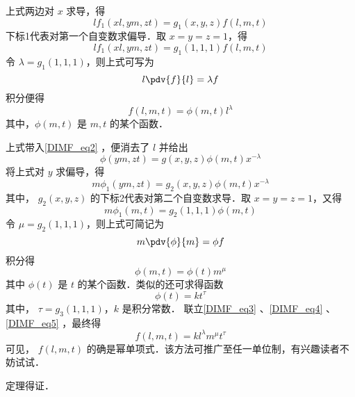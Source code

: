 上式两边对 $x$ 求导，得
\begin{equation}
lf_1(xl,ym,zt)=g_1(x,y,z)f(l,m,t)
\end{equation}
下标1代表对第一个自变数求偏导．取 $x=y=z=1$，得
\begin{equation}
lf_1(xl,ym,zt)=g_1(1,1,1)f(l,m,t)
\end{equation}
令 $\lambda=g_1(1,1,1)$，则上式可写为
\begin{equation}
l\pdv{f}{l}=\lambda f
\end{equation}
积分便得 
\begin{equation}\label{DIMF_eq3}
f(l,m,t)=\phi(m,t)l^{\lambda}
\end{equation}
其中，$\phi(m,t)$ 是 $m,t$ 的某个函数．

上式带入\autoref{DIMF_eq2} ，便消去了 $l$ 并给出
\begin{equation}
\phi(ym,zt)=g(x,y,z)\phi(m,t)x^{-\lambda}
\end{equation}
将上式对 $y$ 求偏导，得
\begin{equation}
m\phi_1(ym,zt)=g_2(x,y,z)\phi(m,t)x^{-\lambda}
\end{equation}
其中， $g_2(x,y,z)$ 的下标2代表对第二个自变数求导．取 $x=y=z=1$，又得
\begin{equation}
m\phi_1(m,t)=g_2(1,1,1)\phi(m,t)
\end{equation}
令 $\mu=g_2(1,1,1)$，则上式可简记为
\begin{equation}
m\pdv{\phi}{m}=\phi f
\end{equation}
积分得
\begin{equation}\label{DIMF_eq4}
\phi(m,t)=\phi(t)m^{\mu}
\end{equation}
其中 $\phi(t)$ 是 $t$ 的某个函数．类似的还可求得函数
\begin{equation}\label{DIMF_eq5}
\phi(t)=kt^{\tau}
\end{equation}
其中， $\tau=g_3(1,1,1)$，$k$ 是积分常数．
联立\autoref{DIMF_eq3} 、\autoref{DIMF_eq4} 、\autoref{DIMF_eq5} ，最终得
\begin{equation}
f(l,m,t)=kl^{\lambda}m^{\mu}t^{\tau}
\end{equation}
可见， $f(l,m,t)$ 的确是幂单项式．该方法可推广至任一单位制，有兴趣读者不妨试试．

定理得证．

